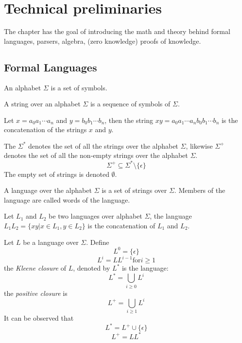 \chapter{Technical preliminaries}

The chapter has the goal of introducing the math and theory behind
formal languages, parsers, algebra, (zero knowledge) proofs of
knowledge.

\section{Formal Languages \cite{Hopcroft}}

\begin{defn}[Alphabet]
  An alphabet $\Sigma$ is a set of symbols.
\end{defn}

\begin{defn}[String]
  A string over an alphabet $\Sigma$ is a sequence of symbols of $\Sigma$.
\end{defn}

\begin{defn}[Concatenation]
  Let $x = a_0 a_1 \dotsm a_n$ and $y = b_0 b_1 \dotsm b_n$, then the
  string $x y = a_0 a_1 \dotsm a_n b_0 b_1 \dotsm b_n$ is the
  concatenation of the strings $x$ and $y$.
\end{defn}

\begin{defn}[Sets]
  The $\Sigma^*$ denotes the set of all the strings over the alphabet
  $\Sigma$, likewise $\Sigma^+$ denotes the set of all the non-empty
  strings over the alphabet $\Sigma$. $$\Sigma^+ \subseteq \Sigma^*
  \setminus \{ \epsilon \}$$ The empty set of strings is denoted
  $\emptyset$.
\end{defn}

\begin{defn}[Language]
  A language over the alphabet $\Sigma$ is a set of strings over
  $\Sigma$. Members of the language are called words of the language.
\end{defn}

\begin{defn}[Concatenation]
  Let $L_1$ and $L_2$ be two languages over alphabet $\Sigma$, the
  language $L_1 L_2 = \{x y | x \in L_1, y \in L_2 \}$ is the
  concatenation of $L_1$ and $L_2$.
\end{defn}

\begin{defn}
  Let $L$ be a language over $\Sigma$. Define 
  $$L^0 = \{ \epsilon \}$$
  $$L^i = L L^{i-1} \textrm{for} i \ge 1$$
  the \emph{Kleene closure} of $L$, denoted by $L^*$ is the language:
  $$ L^* = \bigcup_{i \ge 0} L^i $$
  the \emph{positive closure} is
  $$ L^+ = \bigcup_{i \ge 1} L^i $$
  It can be observed that
  $$ L^* = L^+ \cup \{ \epsilon \} $$
  $$ L^+ = L L^* $$
\end{defn}

